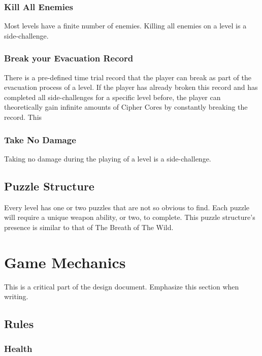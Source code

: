\documentclass[12pt]{article}
\begin{document}
\subsubsection{Kill All Enemies}

Most levels have a finite number of enemies. Killing all enemies on a level is a side-challenge.

\subsubsection{Break your Evacuation Record}

There is a pre-defined time trial record that the player can break as part of the evacuation process of a level. If the player has already broken this record and has completed all side-challenges for a specific level before, the player can theoretically gain infinite amounts of Cipher Cores by constantly breaking the record. This 

\subsubsection{Take No Damage}

Taking no damage during the playing of a level is a side-challenge. 

\subsection{Puzzle Structure}

Every level has one or two puzzles that are not so obvious to find. Each puzzle will require a unique weapon ability, or two, to complete. This puzzle structure's presence is similar to that of The Breath of The Wild. 

\section{Game Mechanics}

This is a critical part of the design document. Emphasize this section when writing.

\subsection{Rules}

\subsubsection{Health}
\end{document}
